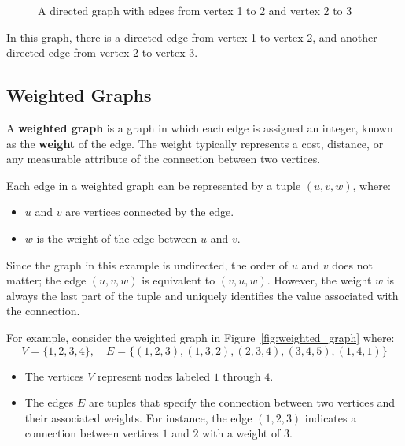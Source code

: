 \begin{figure}[h]
\begin{center}
\caption{A directed graph with edges from vertex 1 to 2 and vertex 2 to 3}
\label{fig:directed_graph}
\end{center}
\end{figure}

In this graph, there is a directed edge from vertex 1 to vertex 2, and another directed edge from vertex 2 to vertex 3. \cite{yadav2023advanced, cormen2009introduction}

\subsection{Weighted Graphs}

A \textbf{weighted graph} is a graph in which each edge is assigned an integer, known as the \textbf{weight} of the edge. The weight typically represents a cost, distance, or any measurable attribute of the connection between two vertices.\cite{mathew2017weighted}

Each edge in a weighted graph can be represented by a tuple \((u, v, w)\), where:
\begin{itemize}
    \item \( u \) and \( v \) are vertices connected by the edge.
    \item \( w \) is the weight of the edge between \( u \) and \( v \).
\end{itemize}
Since the graph in this example is undirected, the order of $u$ and $v$ does not matter; the edge \((u,v,w)\) is equivalent to \((v,u,w)\). However, the weight $w$ is always the last part of the tuple and uniquely identifies the value associated with the connection.

For example, consider the weighted graph in Figure~\ref{fig:weighted_graph} where:
\[
V = \{1, 2, 3, 4\}, \quad E = \{(1, 2, 3), (1, 3, 2), (2, 3, 4), (3, 4, 5), (1, 4, 1)\}
\]

\begin{itemize}
    \item The vertices \( V \) represent nodes labeled \( 1 \) through \( 4 \).
    \item The edges \( E \) are tuples that specify the connection between two vertices and their associated weights. For instance, the edge \( (1, 2, 3) \) indicates a connection between vertices \( 1 \) and \( 2 \) with a weight of \( 3 \).
\end{itemize}

